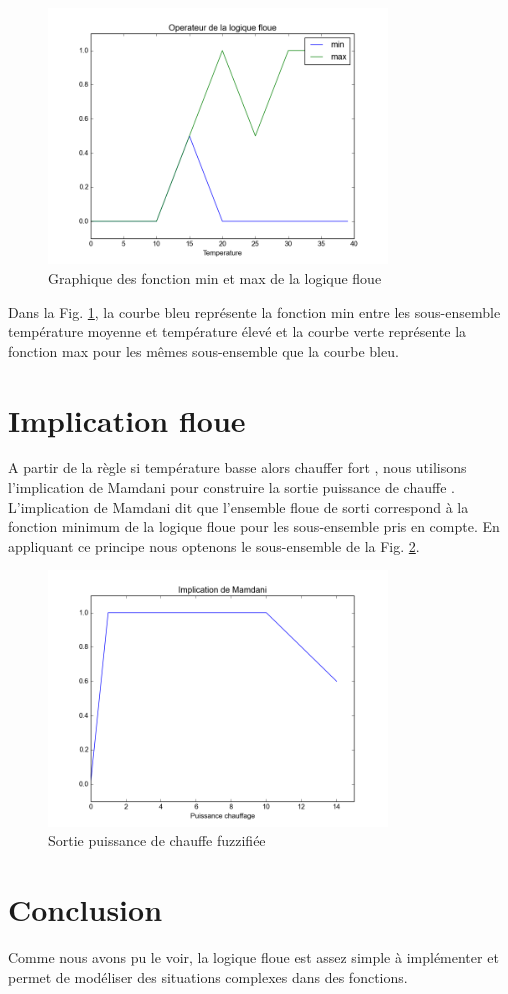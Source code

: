 \documentclass[a4paper,11pt]{article}
\begin{document}
\begin{figure}[!h]
  \begin{center}
    \includegraphics[width=9cm]{operateurFlou.png}
    \caption{Graphique des fonction min et max de la logique floue}
    \label{fig:operateur}
  \end{center}
\end{figure}

Dans la Fig. \ref{fig:operateur}, la courbe bleu représente la fonction min entre les sous-ensemble
température moyenne et température élevé et la courbe verte représente la fonction max pour les mêmes
sous-ensemble que la courbe bleu.

\section{Implication floue}
A partir de la règle \og si température basse alors chauffer fort \fg , nous utilisons l'implication
de Mamdani pour construire la sortie \og puissance de chauffe \fg . L'implication de Mamdani dit que l'ensemble
floue de sorti correspond à la fonction minimum de la logique floue pour les sous-ensemble pris en compte. En appliquant
ce principe nous optenons le sous-ensemble de la Fig. \ref{fig:mamdani}.

\begin{figure}[!h]
  \begin{center}
    \includegraphics[width=9cm]{mamdani.png}
    \caption{Sortie \og puissance de chauffe fuzzifiée \fg}
    \label{fig:mamdani}
  \end{center}
\end{figure}
\newpage
\section{Conclusion}
Comme nous avons pu le voir, la logique floue est assez simple à implémenter et permet de modéliser des situations
complexes dans des fonctions. 
\end{document}
